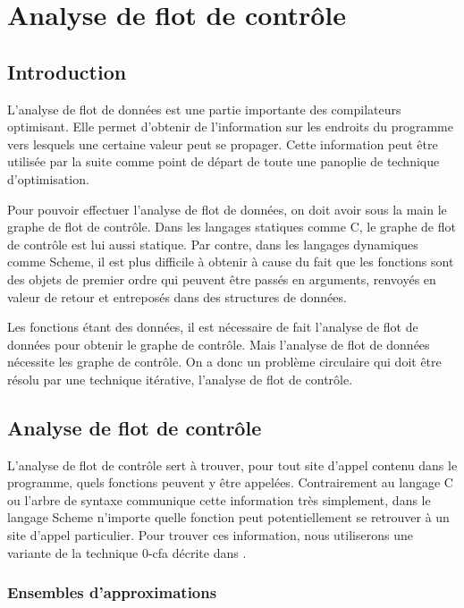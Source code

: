 \chapter{Analyse de flot de contrôle}

\section{Introduction}

L'analyse de flot de données est une partie importante des
compilateurs optimisant. Elle permet d'obtenir de l'information sur
les endroits du programme vers lesquels une certaine valeur peut se
propager. Cette information peut être utilisée par la suite comme
point de départ de toute une panoplie de technique d'optimisation.

Pour pouvoir effectuer l'analyse de flot de données, on doit avoir
sous la main le graphe de flot de contrôle. Dans les langages
statiques comme C, le graphe de flot de contrôle est lui aussi
statique. Par contre, dans les langages dynamiques comme Scheme, il
est plus difficile à obtenir à cause du fait que les fonctions sont
des objets de premier ordre qui peuvent être passés en arguments,
renvoyés en valeur de retour et entreposés dans des structures de
données.

Les fonctions étant des données, il est nécessaire de fait l'analyse de
flot de données pour obtenir le graphe de contrôle. Mais l'analyse de
flot de données nécessite les graphe de contrôle. On a donc un
problème circulaire qui doit être résolu par une technique itérative,
l'analyse de flot de contrôle.


\section{Analyse de flot de contrôle}

L'analyse de flot de contrôle sert à trouver, pour tout site d'appel
contenu dans le programme, quels fonctions peuvent y être
appelées. Contrairement au langage C ou l'arbre de syntaxe communique
cette information très simplement, dans le langage Scheme n'importe
quelle fonction peut potentiellement se retrouver à un site d'appel
particulier. Pour trouver ces information, nous utiliserons une
variante de la technique 0-cfa décrite dans \cite{shivers88, shivers91}.

\subsection{Ensembles d'approximations}

